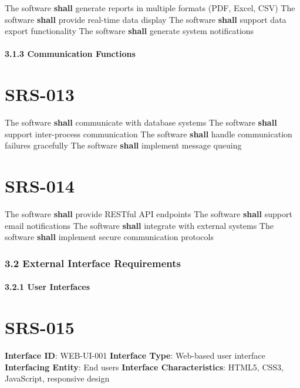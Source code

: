 The software \textbf{shall} generate reports in multiple formats (PDF, Excel, CSV)
The software \textbf{shall} provide real-time data display
The software \textbf{shall} support data export functionality
The software \textbf{shall} generate system notifications

\paragraph{3.1.3 Communication Functions}

\section{SRS-013}\label{SRS-013}

The software \textbf{shall} communicate with database systems
The software \textbf{shall} support inter-process communication
The software \textbf{shall} handle communication failures gracefully
The software \textbf{shall} implement message queuing

\section{SRS-014}\label{SRS-014}

The software \textbf{shall} provide RESTful API endpoints
The software \textbf{shall} support email notifications
The software \textbf{shall} integrate with external systems
The software \textbf{shall} implement secure communication protocols

\subsubsection{3.2 External Interface Requirements}

\paragraph{3.2.1 User Interfaces}

\section{SRS-015}\label{SRS-015}

\textbf{Interface ID}: WEB-UI-001
\textbf{Interface Type}: Web-based user interface
\textbf{Interfacing Entity}: End users
\textbf{Interface Characteristics}: HTML5, CSS3, JavaScript, responsive design

